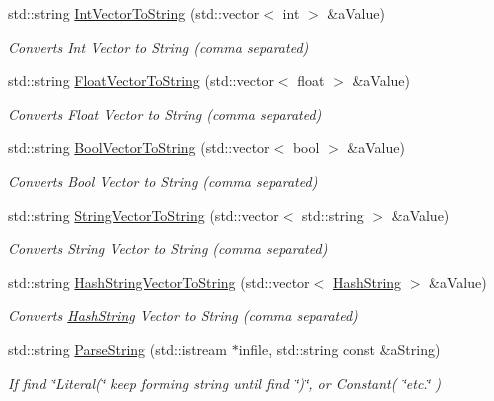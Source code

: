 \begin{DoxyCompactItemize}
std\+::string \hyperlink{namespaceCommon_a4ef73200227be129d5b2349ab9d35b8f}{Int\+Vector\+To\+String} (std\+::vector$<$ int $>$ \&a\+Value)
\begin{DoxyCompactList}\small\item\em Converts Int Vector to String (comma separated) \end{DoxyCompactList}\item 
std\+::string \hyperlink{namespaceCommon_a091ad44f4b1fe6dc8bed8a51d05a66e0}{Float\+Vector\+To\+String} (std\+::vector$<$ float $>$ \&a\+Value)
\begin{DoxyCompactList}\small\item\em Converts Float Vector to String (comma separated) \end{DoxyCompactList}\item 
std\+::string \hyperlink{namespaceCommon_aec7d97bf1dfeed7008f0a6ddb7f5bff9}{Bool\+Vector\+To\+String} (std\+::vector$<$ bool $>$ \&a\+Value)
\begin{DoxyCompactList}\small\item\em Converts Bool Vector to String (comma separated) \end{DoxyCompactList}\item 
std\+::string \hyperlink{namespaceCommon_a3c3ce096acc73170b49d3a86e0e07a86}{String\+Vector\+To\+String} (std\+::vector$<$ std\+::string $>$ \&a\+Value)
\begin{DoxyCompactList}\small\item\em Converts String Vector to String (comma separated) \end{DoxyCompactList}\item 
std\+::string \hyperlink{namespaceCommon_a869bf03747ab50ba14b50147fb4d406e}{Hash\+String\+Vector\+To\+String} (std\+::vector$<$ \hyperlink{classHashString}{Hash\+String} $>$ \&a\+Value)
\begin{DoxyCompactList}\small\item\em Converts \hyperlink{classHashString}{Hash\+String} Vector to String (comma separated) \end{DoxyCompactList}\item 
std\+::string \hyperlink{namespaceCommon_a1858a26280ca754d36e9ff57f85ca5a7}{Parse\+String} (std\+::istream $\ast$infile, std\+::string const \&a\+String)
\begin{DoxyCompactList}\small\item\em If find \char`\"{}\+Literal(\char`\"{} keep forming string until find \char`\"{})\char`\"{}, or Constant( \char`\"{}etc.\char`\"{} ) \end{DoxyCompactList}\item 

\end{DoxyCompactItemize}
